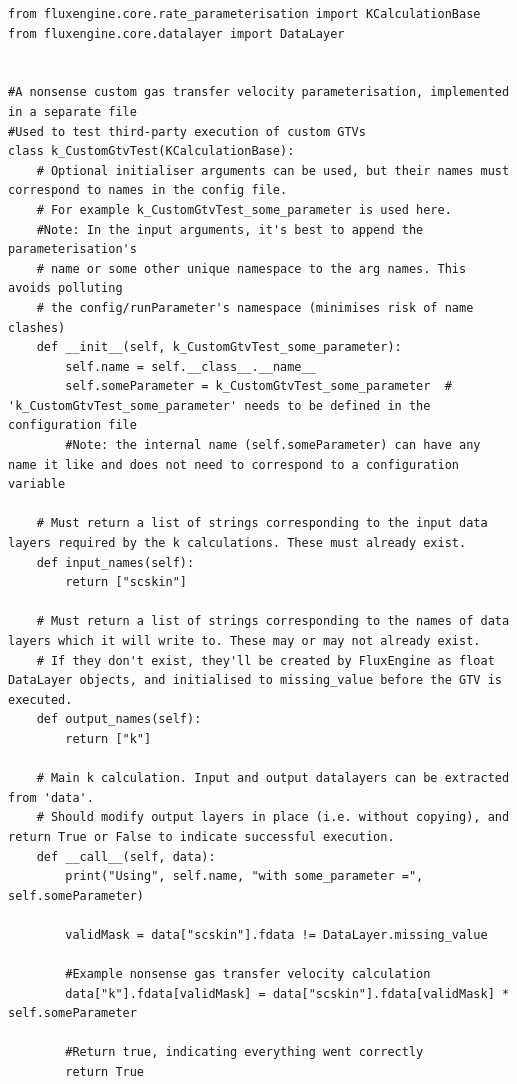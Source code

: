 \documentclass[]{scrartcl}
\begin{document}
\begin{lstlisting}
from fluxengine.core.rate_parameterisation import KCalculationBase
from fluxengine.core.datalayer import DataLayer


#A nonsense custom gas transfer velocity parameterisation, implemented in a separate file
#Used to test third-party execution of custom GTVs
class k_CustomGtvTest(KCalculationBase):
    # Optional initialiser arguments can be used, but their names must correspond to names in the config file.
    # For example k_CustomGtvTest_some_parameter is used here.
    #Note: In the input arguments, it's best to append the parameterisation's
    # name or some other unique namespace to the arg names. This avoids polluting
    # the config/runParameter's namespace (minimises risk of name clashes)
    def __init__(self, k_CustomGtvTest_some_parameter):
        self.name = self.__class__.__name__
        self.someParameter = k_CustomGtvTest_some_parameter  # 'k_CustomGtvTest_some_parameter' needs to be defined in the configuration file
        #Note: the internal name (self.someParameter) can have any name it like and does not need to correspond to a configuration variable

    # Must return a list of strings corresponding to the input data layers required by the k calculations. These must already exist.
    def input_names(self):
        return ["scskin"]

    # Must return a list of strings corresponding to the names of data layers which it will write to. These may or may not already exist.
    # If they don't exist, they'll be created by FluxEngine as float DataLayer objects, and initialised to missing_value before the GTV is executed.
    def output_names(self):
        return ["k"]

    # Main k calculation. Input and output datalayers can be extracted from 'data'.
    # Should modify output layers in place (i.e. without copying), and return True or False to indicate successful execution.
    def __call__(self, data):
        print("Using", self.name, "with some_parameter =", self.someParameter)
        
        validMask = data["scskin"].fdata != DataLayer.missing_value
        
        #Example nonsense gas transfer velocity calculation
        data["k"].fdata[validMask] = data["scskin"].fdata[validMask] * self.someParameter

        #Return true, indicating everything went correctly
        return True
\end{lstlisting}
\end{document}
